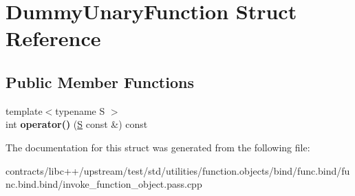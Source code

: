 \hypertarget{struct_dummy_unary_function}{}\section{Dummy\+Unary\+Function Struct Reference}
\label{struct_dummy_unary_function}
\subsection*{Public Member Functions}
\begin{DoxyCompactItemize}
\item 
\mbox{\label{struct_dummy_unary_function_a254474c58489ac9bf95f93ef13290685}} 
{\footnotesize template$<$typename S $>$ }\\int {\bfseries operator()} (\mbox{\hyperlink{struct_s}{S}} const \&) const
\end{DoxyCompactItemize}


The documentation for this struct was generated from the following file\+:\begin{DoxyCompactItemize}
\item 
contracts/libc++/upstream/test/std/utilities/function.\+objects/bind/func.\+bind/func.\+bind.\+bind/invoke\+\_\+function\+\_\+object.\+pass.\+cpp\end{DoxyCompactItemize}
